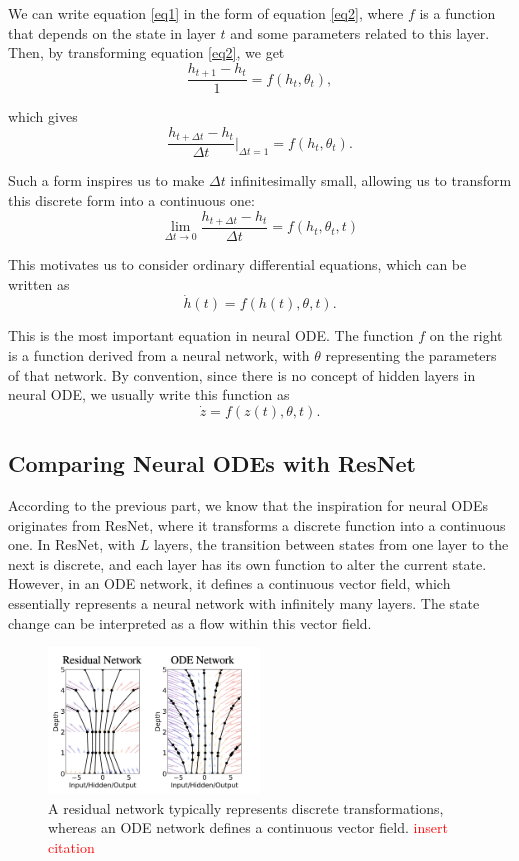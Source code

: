 \documentclass[a4paper,11pt,titlepage]{article}
\theoremstyle{definition}
\theoremstyle{plain}
\theoremstyle{remark}
\begin{document}
We can write equation \ref{eq1} in the form of equation \ref{eq2}, where $f$ is a function that depends on the state in layer $t$ and some parameters related to this layer. Then, by transforming equation \ref{eq2}, we get
$$\frac{h_{t+1} - h_t }{1}= f(h_t, \theta_t),$$

which gives
$$\frac{h_{t+\Delta t} - h_t }{\Delta t}\Bigg|_{\Delta t=1}= f(h_t, \theta_t).$$

Such a form inspires us to make $\Delta t$ infinitesimally small, allowing us to transform this discrete form into a continuous one:
$$\lim_{\Delta t\to 0}\frac{h_{t+\Delta t} - h_t }{\Delta t}= f(h_t, \theta_t,t)$$

This motivates us to consider ordinary differential equations, which can be written as
$$\dot{h}(t)=f(h(t),\theta,t).$$

This is the most important equation in neural ODE. The function $f$ on the right is a function derived from a neural network, with $\theta$ representing the parameters of that network. By convention, since there is no concept of hidden layers in neural ODE, we usually write this function as
$$\dot{z}= f(z(t), \theta,t).$$

\subsection{Comparing Neural ODEs with ResNet}

According to the previous part, we know that the inspiration for neural ODEs originates from ResNet, where it transforms a discrete function into a continuous one. In ResNet, with $L$ layers, the transition between states from one layer to the next is discrete, and each layer has its own function to alter the current state. However, in an ODE network, it defines a continuous vector field, which essentially represents a neural network with infinitely many layers. The state change can be interpreted as a flow within this vector field.

\begin{figure}[htbp]
    \centering
    \includegraphics[width=0.5\textwidth]{report/figures/ResNetvsODENet.png}
    \caption{A residual network typically represents discrete transformations, whereas an ODE network defines a continuous vector field. \textcolor{red}{insert citation}}
    \label{fig:enter-label}
\end{figure}
\end{document}
